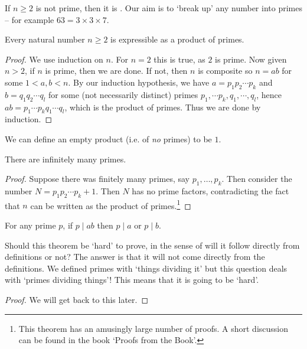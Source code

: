 \documentclass[a4]{scrartcl}
\begin{document}
If $n \geq 2$ is not prime, then it is . Our aim is to `break up' any number into primes -- for example $63 = 3 \times 3 \times 7$.


\begin{proposition}
	Every natural number $n \geq 2$ is expressible as a product of primes.
\end{proposition}
\begin{proof}
	We use induction on $n$. For $n = 2$ this is true, as $2$ is prime. Now given $n > 2$, if $n$ is prime, then we are done. If not, then $n$ is composite so $n = ab$ for some $1 < a, b < n$. By our induction hypothesis, we have $a = p_1 p_2 \cdots p_k$ and $b = q_1 q_2 \cdots q_l$ for some (not necessarily distinct) primes $p_1, \cdots p_k, q_1, \cdots, q_l$, hence $ab = p_1 \cdots p_k q_1 \cdots q_l$, which is the product of primes. Thus we are done by induction.
\end{proof}

\begin{remark}
	We can define an empty product (i.e. of \emph{no} primes) to be $1$.
\end{remark}

\begin{theorem}[Euclid]
	There are infinitely many primes.
\end{theorem}
\begin{proof}
	Suppose there was finitely many primes, say $p_1, \dots, p_k$. Then consider the number $N = p_1 p_2 \cdots p_k + 1$. Then $N$ has no prime factors, contradicting the fact that $n$ can be written as the product of primes.\footnote{This theorem has an amusingly large number of proofs. A short discussion can be found in the book `Proofs from the Book'.} 
\end{proof}

\begin{theorem}
	For any prime $p$, if $p \mid ab$ then $p \mid a$ or $p \mid b$. 
\end{theorem}
\begin{remark}
	Should this theorem be `hard' to prove, in the sense of will it follow directly from definitions or not? The answer is that it will not come directly from the definitions. We defined primes with `things dividing it' but this question deals with `primes dividing things'! This means that it is going to be `hard'.
\end{remark}
\begin{proof}
	We will get back to this later.
\end{proof}
\end{document}
